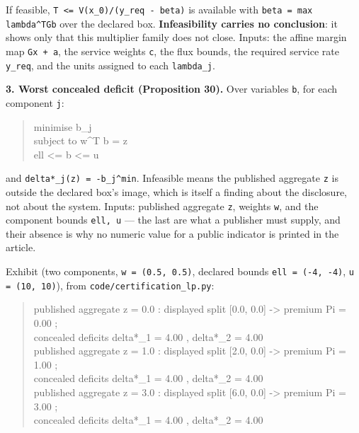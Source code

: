 \documentclass[11pt]{article}
\begin{document}
If feasible, \texttt{T <= V(x\_0)/\allowbreak{}(y\_req - bet\allowbreak{}a)} is available with \texttt{beta = max l\allowbreak{}ambda\textasciicircum{}TGb} over the declared box. \textbf{Infeasibility carries no conclusion}: it shows only that this multiplier family does not close. Inputs: the affine margin map \texttt{Gx + a}, the service weights \texttt{c}, the flux bounds, the required service rate \texttt{y\_req}, and the units assigned to each \texttt{lambda\_j}.

\textbf{3. Worst concealed deficit (Proposition 30).} Over variables \texttt{b}, for each component \texttt{j}:

\begin{quote}\ttfamily\footnotesize\raggedright\setlength{\parskip}{0pt}
minimise   b\_j\\
subject to w\textasciicircum{}T b = z\\
           ell <= b <= u
\end{quote}

and \texttt{delta*\_j(z) \allowbreak{}= -\allowbreak{}b\_j\textasciicircum{}min}. Infeasible means the published aggregate \texttt{z} is outside the declared box's image, which is itself a finding about the disclosure, not about the system. Inputs: published aggregate \texttt{z}, weights \texttt{w}, and the component bounds \texttt{ell, u} --- the last are what a publisher must supply, and their absence is why no numeric value for a public indicator is printed in the article.

Exhibit (two components, \texttt{w = (0.\allowbreak{}5, 0.\allowbreak{}5)}, declared bounds \texttt{ell = (-\allowbreak{}4, -\allowbreak{}4)}, \texttt{u = (10, 10)}), from \texttt{code/\allowbreak{}certificatio\allowbreak{}n\_lp.\allowbreak{}py}:

\begin{quote}\ttfamily\footnotesize\raggedright\setlength{\parskip}{0pt}
published aggregate z =  0.0 :  displayed split [0.0, 0.0] -> premium Pi =  0.00 ;\\
                                 concealed deficits delta*\_1 = 4.00 , delta*\_2 = 4.00\\
published aggregate z =  1.0 :  displayed split [2.0, 0.0] -> premium Pi =  1.00 ;\\
                                 concealed deficits delta*\_1 = 4.00 , delta*\_2 = 4.00\\
published aggregate z =  3.0 :  displayed split [6.0, 0.0] -> premium Pi =  3.00 ;\\
                                 concealed deficits delta*\_1 = 4.00 , delta*\_2 = 4.00
\end{quote}
\end{document}
